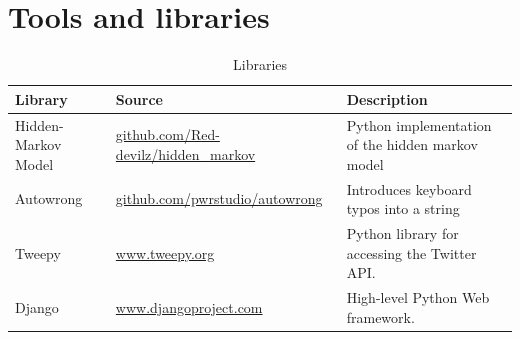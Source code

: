 \documentclass[12pt]{article}
\begin{document}
\section{Tools and libraries}\label{libraries}
\begin{table}[!htbp]
  \centering
  \setlength{\tabcolsep}{0.4em}
    \begin{tabularx}{\linewidth}{XlX}
    \toprule
    Library & Source & Description \\
    \midrule
    Hidden-Markov Model &  \url{github.com/Red-devilz/hidden_markov}
    & Python implementation of the hidden markov model \\
    \midrule
    Autowrong & \url{github.com/pwrstudio/autowrong} & Introduces keyboard
    typos into a string \\
    \midrule
    Tweepy & \url{www.tweepy.org} & Python library for accessing the Twitter
    API.
    \\
    \midrule
    Django & \url{www.djangoproject.com} & High-level Python Web
    framework.
    \\
    \bottomrule
    \end{tabularx}%
    \caption{Libraries}
  \label{tab:libraries}%
\end{table}%





% 
\end{document}
